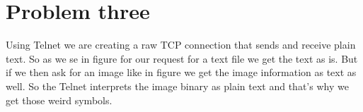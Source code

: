 \documentclass[a4paper,12pt]{article}
\numberwithin{figure}{section}
\begin{document}
\newpage

\section{Problem three}

Using Telnet we are creating a raw TCP connection that sends and receive plain text. So as we se in figure \cite{TEXT} for our request for a text file we get the text as is. But if we then ask for an image like in figure \cite{IMAGE} we get the image information as text as well. So the Telnet interprets the image binary as plain text and that's why we get those weird symbols.
\end{document}
